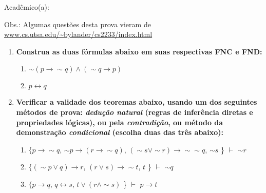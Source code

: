 \documentclass[a4paper,12pt]{article}
\begin{document}


\vskip 0.5cm Acadêmico(a): \hrulefill%


\footnotesize{Obs.: Algumas questões desta prova vieram de \url{www.cs.utsa.edu/~bylander/cs2233/index.html}}

\begin{enumerate}

\item {\bf Construa as duas fórmulas abaixo em suas respectivas FNC e FND:} %
\begin{enumerate}
\setlength{\itemsep}{-3pt}
\item  $\sim (p\rightarrow \sim q)  \wedge (\sim q \rightarrow p) $
\item  $p \leftrightarrow q $
\end{enumerate}

\item {\bf Verificar a validade dos teoremas abaixo, usando um dos seguintes métodos de prova:  \textit{dedução natural}  (regras de inferência diretas e propriedades lógicas), ou pela \textit{contradição}, ou método da demonstração \textit{condicional} (escolha duas das três abaixo):}


\begin{enumerate}
\setlength{\itemsep}{-2pt} 
 \item $\{ p\rightarrow \sim q$, $\sim p \rightarrow (r \rightarrow \sim q)$, $(\sim s \vee \sim r)\rightarrow \sim \sim q$, $\sim s$ \} {\large $\vdash$} $\sim r$

\item $\{(\sim p\vee q) \rightarrow r$,  $(r \vee s)\rightarrow \sim t$, $t$ \} {\large $\vdash $} $\sim q$

\item $\{ p\rightarrow q$, $q \leftrightarrow s$, $t\vee (r\wedge \sim s)$ \} {\large $\vdash $} $p \rightarrow t$



\end{enumerate}


\end{enumerate}
\end{document}
